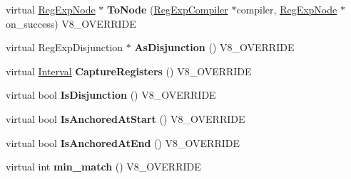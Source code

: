 \begin{DoxyCompactItemize}
\item 
\hypertarget{classv8_1_1internal_1_1_v8___f_i_n_a_l_aa183d4adede0c6af0c092eeebf59c194}{}virtual \hyperlink{classv8_1_1internal_1_1_reg_exp_node}{Reg\+Exp\+Node} $\ast$ {\bfseries To\+Node} (\hyperlink{classv8_1_1internal_1_1_reg_exp_compiler}{Reg\+Exp\+Compiler} $\ast$compiler, \hyperlink{classv8_1_1internal_1_1_reg_exp_node}{Reg\+Exp\+Node} $\ast$on\+\_\+success) V8\+\_\+\+O\+V\+E\+R\+R\+I\+D\+E\label{classv8_1_1internal_1_1_v8___f_i_n_a_l_aa183d4adede0c6af0c092eeebf59c194}

\item 
\hypertarget{classv8_1_1internal_1_1_v8___f_i_n_a_l_aea2a35d9b572715c4f5b2e83ea914c89}{}virtual Reg\+Exp\+Disjunction $\ast$ {\bfseries As\+Disjunction} () V8\+\_\+\+O\+V\+E\+R\+R\+I\+D\+E\label{classv8_1_1internal_1_1_v8___f_i_n_a_l_aea2a35d9b572715c4f5b2e83ea914c89}

\item 
\hypertarget{classv8_1_1internal_1_1_v8___f_i_n_a_l_ac1bfb16ce46192182988ae324c15decf}{}virtual \hyperlink{classv8_1_1internal_1_1_interval}{Interval} {\bfseries Capture\+Registers} () V8\+\_\+\+O\+V\+E\+R\+R\+I\+D\+E\label{classv8_1_1internal_1_1_v8___f_i_n_a_l_ac1bfb16ce46192182988ae324c15decf}

\item 
\hypertarget{classv8_1_1internal_1_1_v8___f_i_n_a_l_a3cd093dac98fd6e37254ad29f9a40a12}{}virtual bool {\bfseries Is\+Disjunction} () V8\+\_\+\+O\+V\+E\+R\+R\+I\+D\+E\label{classv8_1_1internal_1_1_v8___f_i_n_a_l_a3cd093dac98fd6e37254ad29f9a40a12}

\item 
\hypertarget{classv8_1_1internal_1_1_v8___f_i_n_a_l_a1303853ed1afec044f4a5c65f06e977b}{}virtual bool {\bfseries Is\+Anchored\+At\+Start} () V8\+\_\+\+O\+V\+E\+R\+R\+I\+D\+E\label{classv8_1_1internal_1_1_v8___f_i_n_a_l_a1303853ed1afec044f4a5c65f06e977b}

\item 
\hypertarget{classv8_1_1internal_1_1_v8___f_i_n_a_l_af12a212dba3f2fafc3dc142311b35977}{}virtual bool {\bfseries Is\+Anchored\+At\+End} () V8\+\_\+\+O\+V\+E\+R\+R\+I\+D\+E\label{classv8_1_1internal_1_1_v8___f_i_n_a_l_af12a212dba3f2fafc3dc142311b35977}

\item 
\hypertarget{classv8_1_1internal_1_1_v8___f_i_n_a_l_ac4abdb29d336dc24ef96695ac805b1ac}{}virtual int {\bfseries min\+\_\+match} () V8\+\_\+\+O\+V\+E\+R\+R\+I\+D\+E\label{classv8_1_1internal_1_1_v8___f_i_n_a_l_ac4abdb29d336dc24ef96695ac805b1ac}


\end{DoxyCompactItemize}
